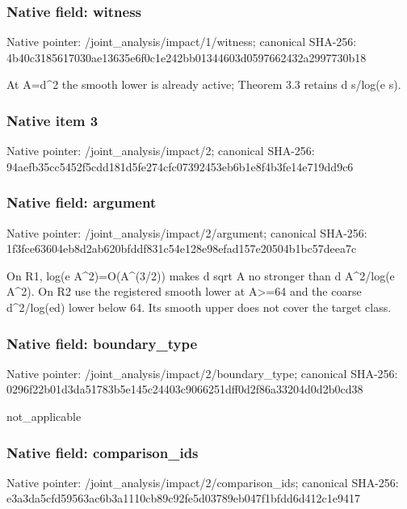 \documentclass[10pt,a4paper]{article}
\begin{document}
\subsubsection{Native field: witness}
Native pointer: /joint\_\allowbreak{}analysis/impact/1/witness; canonical SHA-256: 4b40c3185617030ae13635e6f0c1e242bb01344603d0597662432a2997730b18

\begingroup\raggedright\sloppy At A=\allowbreak{}d\textasciicircum{}2 the smooth lower is already active;\allowbreak{} Theorem 3.3 retains d s/\allowbreak{}log(e s).\par\endgroup

\subsubsection{Native item 3}
Native pointer: /joint\_\allowbreak{}analysis/impact/2; canonical SHA-256: 94aefb35cc5452f5cdd181d5fe274cfc07392453eb6b1e8f4b3fe14e719dd9c6

\subsubsection{Native field: argument}
Native pointer: /joint\_\allowbreak{}analysis/impact/2/argument; canonical SHA-256: 1f3fce63604eb8d2ab620bfddf831c54e128e98efad157e20504b1bc57deea7c

\begingroup\raggedright\sloppy On R1,\allowbreak{} log(e A\textasciicircum{}2)=\allowbreak{}O(A\textasciicircum{}(3/\allowbreak{}2)) makes d sqrt A no stronger than d A\textasciicircum{}2/\allowbreak{}log(e A\textasciicircum{}2). On R2 use the registered smooth lower at A>=\allowbreak{}64 and the coarse d\textasciicircum{}2/\allowbreak{}log(ed) lower below 64. Its smooth upper does not cover the target class.\par\endgroup

\subsubsection{Native field: boundary\_\allowbreak{}type}
Native pointer: /joint\_\allowbreak{}analysis/impact/2/boundary\_\allowbreak{}type; canonical SHA-256: 0296f22b01d3da51783b5e145c24403c9066251dff0d2f86a33204d0d2b0cd38

\begingroup\raggedright\sloppy not\_\allowbreak{}applicable\par\endgroup

\subsubsection{Native field: comparison\_\allowbreak{}ids}
Native pointer: /joint\_\allowbreak{}analysis/impact/2/comparison\_\allowbreak{}ids; canonical SHA-256: e3a3da5cfd59563ac6b3a1110cb89c92fe5d03789eb047f1bfdd6d412c1e9417
\end{document}
